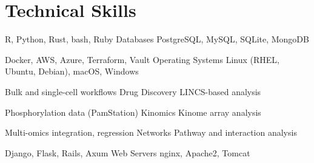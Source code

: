 \section{Technical Skills}

{R, Python, Rust, bash, Ruby}
{Databases}
{PostgreSQL, MySQL, SQLite, MongoDB}

{Docker, AWS, Azure, Terraform, Vault}
{Operating Systems}
{Linux (RHEL, Ubuntu, Debian), macOS, Windows}

{Bulk and single-cell workflows}
{Drug Discovery}
{LINCS-based analysis}

{Phosphorylation data (PamStation)}
{Kinomics}
{Kinome array analysis}

{Multi-omics integration, regression}
{Networks}
{Pathway and interaction analysis}

{Django, Flask, Rails, Axum}
{Web Servers}
{nginx, Apache2, Tomcat}

